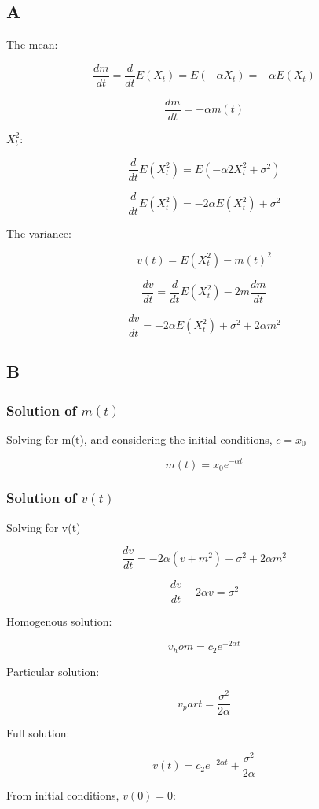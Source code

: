 \documentclass{article}
\begin{document}
\subsection{A}

The mean:

$$\frac{dm}{dt} = \frac{d}{dt}E(X_t) = E(-\alpha X_t) = -\alpha E(X_t)$$

$$\frac{dm}{dt} = -\alpha m(t)$$

$X_t^2$:

$$\frac{d}{dt}E(X_t^2) = E(- \alpha 2X_t^2 + \sigma^2)$$

$$\frac{d}{dt}E(X_t^2) = -2 \alpha E(X_t^2) + \sigma^2$$

The variance:

$$v(t) = E(X_t^2) -m(t)^2$$

$$\frac{dv}{dt} = \frac{d}{dt}E(X_t^2) - 2m\frac{dm}{dt}$$

$$\frac{dv}{dt} = -2 \alpha E(X_t^2) + \sigma^2 + 2 \alpha m^2$$

\subsection{B}

\subsubsection{Solution of $m(t)$}

Solving for m(t), and considering the initial conditions, $c=x_0$

$$m(t) = x_0 e^{-\alpha t}$$

\subsubsection{Solution of $v(t)$}

Solving for v(t)

$$\frac{dv}{dt} = -2 \alpha (v + m^2) + \sigma^2 + 2 \alpha m^2$$

$$\frac{dv}{dt} +  2 \alpha v = \sigma^2$$

Homogenous solution:

$$v_hom = c_2 e^{-2 \alpha t}$$

Particular solution:

$$v_part = \frac{\sigma^2}{2 \alpha}$$

Full solution:

$$ v(t) = c_2 e^{-2 \alpha t} + \frac{\sigma^2}{2 \alpha}$$

From initial conditions, $v(0) = 0$:
\end{document}
